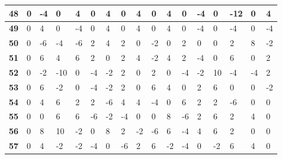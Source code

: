 \begin{longtable}[c]{|l|l|l|l|l|l|l|l|l|l|l|l|l|l|l|l|l|}
\textbf{48} & 0          & -4         & 0          & 4          & 0          & 4          & 0          & 4          & 0          & 4          & 0           & -4          & 0           & -12         & 0           & 4           \\ \hline
\textbf{49} & 0          & 4          & 0          & -4         & 0          & 4          & 0          & 4          & 0          & 4          & 0           & -4          & 0           & -4          & 0           & -4          \\ \hline
\textbf{50} & 0          & -6         & -4         & -6         & 2          & 4          & 2          & 0          & -2         & 0          & 2           & 0           & 0           & 2           & 8           & -2          \\ \hline
\textbf{51} & 0          & 6          & 4          & 6          & 2          & 0          & 2          & 4          & -2         & 4          & 2           & -4          & 0           & 6           & 0           & 2           \\ \hline
\textbf{52} & 0          & -2         & -10        & 0          & -4         & -2         & 2          & 0          & 2          & 0          & -4          & -2          & 10          & -4          & -4          & 2           \\ \hline
\textbf{53} & 0          & 6          & -2         & 0          & -4         & -2         & 2          & 0          & 6          & 4          & 0           & 2           & 6           & 0           & 0           & -2          \\ \hline
\textbf{54} & 0          & 4          & 6          & 2          & 2          & -6         & 4          & 4          & -4         & 0          & 6           & 2           & 2           & -6          & 0           & 0           \\ \hline
\textbf{55} & 0          & 0          & 6          & 6          & -6         & -2         & -4         & 0          & 0          & 8          & -6          & 2           & 6           & 2           & 4           & 0           \\ \hline
\textbf{56} & 0          & 8          & 10         & -2         & 0          & 8          & 2          & -2         & -6         & 6          & -4          & 4           & 6           & 2           & 0           & 0           \\ \hline
\textbf{57} & 0          & 4          & -2         & -2         & -4         & 0          & -6         & 2          & 6          & -2         & -4          & 0           & -2          & 6           & 4           & 0           \\ \hline

\end{longtable}
